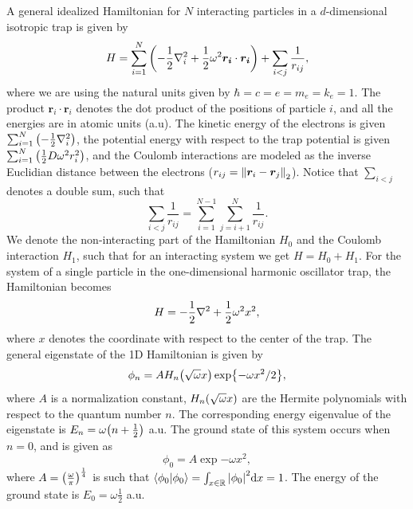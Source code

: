 A general idealized Hamiltonian for $N$ interacting particles in a $d$-dimensional isotropic trap is given by 
\begin{equation}
    H = \sum_{i=1}^N \qty(-\frac{1}{2}\laplacian_i+ \frac{1}{2}\omega^2 \bm{r_i}\cdot\bm{r_i}) + \sum_{i<j}\frac{1}{r_{ij}}, 
\end{equation}
where we are using the natural units given by $\hbar=c=e=m_e=k_e=1$. The product $\bm{r}_i\cdot\bm{r}_i$ denotes the dot product of the positions of particle $i$, and all the energies are in atomic units (a.u). The kinetic energy of the electrons is given $\sum_{i=1}^N\qty(-\frac{1}{2}\laplacian_i)$, the potential energy with respect to the trap potential is given $\sum_{i=1}^N \qty(\frac{1}{2}D\omega^2r_i^2)$, and the Coulomb interactions are modeled as the inverse Euclidian distance between the electrons ($r_{ij} = \norm{\bm{r}_i-\bm{r}_j}_2$). Notice that $\sum_{i<j}$ denotes a double sum, such that 
\begin{equation}
    \sum_{i<j}\frac{1}{r_{ij}} = \sum_{i=1}^{N-1}\sum_{j=i+1}^N\frac{1}{r_{ij}}. 
\end{equation}
We denote the non-interacting part of the Hamiltonian $H_0$ and the Coulomb interaction $H_1$, such that for an interacting system we get $H = H_0 + H_1$. For the system of a single particle in the one-dimensional harmonic oscillator trap, the Hamiltonian becomes
\begin{equation}\label{eq:1dHamiltonian}
    H = -\frac{1}{2}\laplacian + \frac{1}{2}\omega^2 x^2, 
\end{equation}
where $x$ denotes the coordinate with respect to the center of the trap. The general eigenstate of the 1D Hamiltonian is given by  
\begin{equation}
    \phi_n = AH_n\qty(\sqrt{\omega}x)\exp{-\omega x^2/2}, 
\end{equation}
where $A$ is a normalization constant, $H_n\qty(\sqrt{\omega}x)$ are the Hermite polynomials with respect to the quantum number $n$. The corresponding energy eigenvalue of the eigenstate is $E_n = \omega\qty(n + \frac{1}{2})$ a.u. The ground state of this system occurs when $n=0$, and is given as 
\begin{equation}
    \phi_0 = A\exp{-\omega x^2}, 
\end{equation}
where $A = \qty(\frac{\omega}{\pi})^{\frac{1}{4}}$ is such that $\braket{\phi_0} = \int_{x\in\mathbb{R}}\abs{\phi_0}^2\mathrm{d}x = 1$. The energy of the ground state is $E_0 = \omega\frac{1}{2}$ a.u. 

